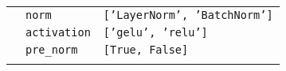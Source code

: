 \documentclass[a4paper,oneside,bibliography=totoc]{scrbook}
\begin{document}
\begin{table}[htbp]
\begin{adjustbox}{center}
\begin{tabular}{lp{5cm}p{8cm}}
                  & \texttt{norm} & \texttt{['LayerNorm', 'BatchNorm']} \\
                  & \texttt{activation} & \texttt{['gelu', 'relu']} \\
                  & \texttt{pre\_norm} & \texttt{[True, False]} \\
\bottomrule
\label{tab:model_hp}
\end{tabular}
\end{adjustbox}
\end{table}


\end{document}
